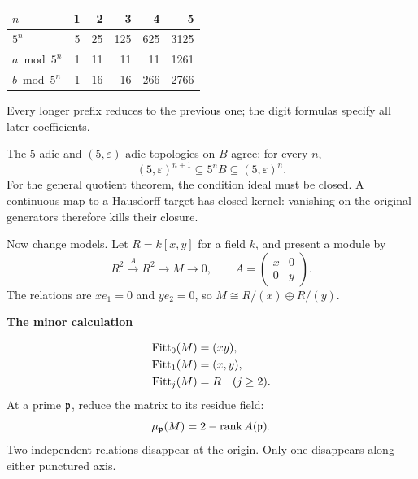 \begin{center}\small
\begin{tabular}{@{}lrrrrr@{}}\toprule
$n$ & 1 & 2 & 3 & 4 & 5\\\midrule
$5^n$ & 5 & 25 & 125 & 625 & 3125\\
$a\bmod5^n$ & 1 & 11 & 11 & 11 & 1261\\
$b\bmod5^n$ & 1 & 16 & 16 & 266 & 2766\\\bottomrule
\end{tabular}
\end{center}
Every longer prefix reduces to the previous one; the digit formulas specify all later coefficients.

The $5$-adic and $(5,\varepsilon)$-adic topologies on $B$ agree: for every $n$,
\[
(5,\varepsilon)^{n+1}\subseteq 5^nB\subseteq(5,\varepsilon)^n.
\]
For the general quotient theorem, the condition ideal must be closed. A continuous map to a Hausdorff target has closed kernel: vanishing on the original generators therefore kills their closure.



Now change models. Let $R=k[x,y]$ for a field $k$, and present a module by
\[
R^2\xrightarrow{A}R^2\longrightarrow M\longrightarrow0,
\qquad
A=\begin{pmatrix}x&0\\0&y\end{pmatrix}.
\]
The relations are $xe_1=0$ and $ye_2=0$, so $M\cong R/(x)\oplus R/(y)$.

\begin{minipage}[c]{.48\linewidth}
\end{minipage}\hfill
\begin{minipage}[c]{.48\linewidth}
{\sffamily\bfseries The minor calculation}\par
\[
\begin{aligned}
\operatorname{Fitt}_0(M)&=(xy),\\
\operatorname{Fitt}_1(M)&=(x,y),\\
\operatorname{Fitt}_j(M)&=R\quad(j\ge2).
\end{aligned}
\]
At a prime $\mathfrak p$, reduce the matrix to its residue field:
\[
\mu_{\mathfrak p}(M)=2-\operatorname{rank} A(\mathfrak p).
\]
Two independent relations disappear at the origin. Only one disappears along either punctured axis.
\end{minipage}

